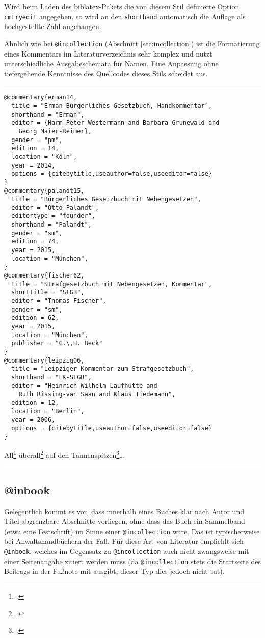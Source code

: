 \documentclass[11pt,a4paper,DIV=calc]{scrartcl}
\newcommand\software[1]{\textsf{#1}}
\newenvironment{rubexample}{\par\vspace{\baselineskip}\hrule\par\begin{refsection}}{\end{refsection}\par\hrule\par\vspace{\baselineskip}}
\begin{document}
Wird beim Laden des \software{biblatex}-Pakets die von diesem Stil
definierte Option \verb+cmtryedit+ angegeben, so wird an den
\verb+shorthand+ automatisch die Auflage als hochgestellte Zahl
angehangen.

Ähnlich wie bei \verb+@incollection+ (Abschnitt
\ref{sec:incollection}) ist die Formatierung eines Kommentars im
Literaturverzeichnis sehr komplex und nutzt unterschiedliche
Ausgabeschemata für Namen. Eine Anpassung ohne tiefergehende
Kenntnisse des Quellcodes dieses Stils scheidet aus.

\begin{rubexample}
\begin{verbatim}
@commentary{erman14,
  title = "Erman Bürgerliches Gesetzbuch, Handkommentar",
  shorthand = "Erman",
  editor = {Harm Peter Westermann and Barbara Grunewald and
    Georg Maier-Reimer},
  gender = "pm",
  edition = 14,
  location = "Köln",
  year = 2014,
  options = {citebytitle,useauthor=false,useeditor=false}
}
@commentary{palandt15,
  title = "Bürgerliches Gesetzbuch mit Nebengesetzen",
  editor = "Otto Palandt",
  editortype = "founder",
  shorthand = "Palandt",
  gender = "sm",
  edition = 74,
  year = 2015,
  location = "München",
}
@commentary{fischer62,
  title = "Strafgesetzbuch mit Nebengesetzen, Kommentar",
  shorttitle = "StGB",
  editor = "Thomas Fischer",
  gender = "sm",
  edition = 62,
  year = 2015,
  location = "München",
  publisher = "C.\,H. Beck"
}
@commentary{leipzig06,
  title = "Leipziger Kommentar zum Strafgesetzbuch",
  shorthand = "LK-StGB",
  editor = "Heinrich Wilhelm Laufhütte and
    Ruth Rissing-van Saan and Klaus Tiedemann",
  edition = 12,
  location = "Berlin",
  year = 2006,
  options = {citebytitle,useauthor=false,useeditor=false}
}
\end{verbatim}

All\footcite[Ellenberger][\S\,12 Rnr. 7]{palandt15}
überall\footcite[Grunewald][\S\,12 Rnr. 6]{erman14}
auf den
Tannenspitzen\footcites[][\S\,242 Rnr. 10]{fischer62}[Laufhütte][\S\,242\,Rnr. 15]{leipzig06}\ldots

\printbibliography
\end{rubexample}

\subsection{@inbook}

Gelegentlich kommt es vor, dass innerhalb eines Buches klar nach Autor
und Titel abgrenzbare Abschnitte vorliegen, ohne dass das Buch ein
Sammelband (etwa eine Festschrift) im Sinne einer \verb+@incollection+
wäre. Das ist typischerweise bei Anwaltshandbüchern der Fall. Für diese
Art von Literatur empfiehlt sich \verb+@inbook+, welches im Gegensatz
zu \verb+@incollection+ auch nicht zwangsweise mit einer Seitenangabe
zitiert werden muss (da \verb+@incollection+ stets die Startseite des
Beitrags in der Fußnote mit ausgibt, dieser Typ dies jedoch nicht
tut).
\end{document}
